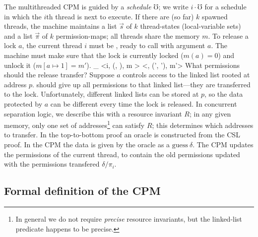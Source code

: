 The multithreaded CPM is guided by a \emph{schedule} $\mho$; we write $i \cdot \mho$ for a schedule in which the $i$th thread is next to execute.  If there are (so far) $k$ spawned threads, the machine maintains a list $\vec{s}$ of $k$ thread-states (local-variable sets) and a list $\vec{\pi}$ of $k$ permission-maps; all threads share the memory $m$.
To release a lock $a$, the current thread $i$ must be , 
ready to call  with argument $a$. The machine must make sure 
that the lock is currently locked ($m(a)=0$) and unlock it ($m[a \mapsto 1]= m'$).
{\!\Psi \vdash_ \!\!
\left<i\cdot\mho, (, \vec{\pi}), m \right>
\mapsto
\left<\mho, (', \vec{\pi}'), m'\right>\!\!
  }
What permissions should the release transfer? Suppose $a$ 
controls access to the
linked list rooted at address $p$.  should give 
up all permissions to that linked list---they are transferred to the lock.
Unfortunately, different linked lists can be stored at $p$, so the data 
protected by $a$  can be different every time the lock is released.
In concurrent separation logic, we describe this with a resource
invariant $R$; in any given memory, only one set of
addresses\footnote{In general we do not require \emph{precise}
  resource invariants, but the linked-list predicate happens to be
  precise.} can satisfy $R$; this determines which addresses to
transfer. In the top-to-bottom proof an oracle is constructed from the CSL proof.
In the CPM the data is given by the oracle as a $\mathrm{guess}~\delta$. The CPM 
updates the permissions of the current thread, to contain the old permissions
updated with the permissions transfered $\delta / \pi_i$.



\subsection{Formal definition of the CPM}\label{sec:cpmdefs}


